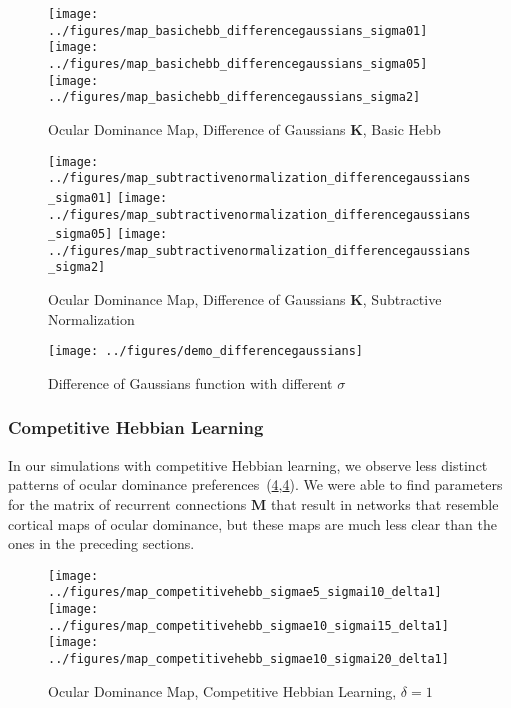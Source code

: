 \documentclass[pageno]{mat323paper}
\begin{document}
\begin{figure}[h]
\texttt{[image: ../figures/map\_basichebb\_differencegaussians\_sigma01]}
\texttt{[image: ../figures/map\_basichebb\_differencegaussians\_sigma05]}
\texttt{[image: ../figures/map\_basichebb\_differencegaussians\_sigma2]}
\caption{Ocular Dominance Map, Difference of Gaussians $\mathbf{K}$, Basic Hebb}
\label{fig:map_differencegaussians_hebb}
\end{figure}

\begin{figure}[h]
\texttt{[image: ../figures/map\_subtractivenormalization\_differencegaussians\_sigma01]}
\texttt{[image: ../figures/map\_subtractivenormalization\_differencegaussians\_sigma05]}
\texttt{[image: ../figures/map\_subtractivenormalization\_differencegaussians\_sigma2]}
\caption{Ocular Dominance Map, Difference of Gaussians $\mathbf{K}$, Subtractive Normalization}
\label{fig:map_differencegaussians_subtractivenormalization}
\end{figure}

\begin{figure}[h]
\centering
\texttt{[image: ../figures/demo\_differencegaussians]}
\caption{Difference of Gaussians function with different $\sigma$}
\label{fig:demo_differencegaussians}
\end{figure}

\subsubsection{Competitive Hebbian Learning}
In our simulations with competitive Hebbian learning, we observe less distinct patterns of ocular dominance preferences~(\ref{fig:map_competitivehebb},\ref{fig:map_competitivehebb}). We were able to find parameters for the matrix of recurrent connections $\mathbf{M}$ that result in networks that resemble cortical maps of ocular dominance, but these maps are much less clear than the ones in the preceding sections.

\begin{figure}[h]
\texttt{[image: ../figures/map\_competitivehebb\_sigmae5\_sigmai10\_delta1]}
\texttt{[image: ../figures/map\_competitivehebb\_sigmae10\_sigmai15\_delta1]}
\texttt{[image: ../figures/map\_competitivehebb\_sigmae10\_sigmai20\_delta1]}
\caption{Ocular Dominance Map, Competitive Hebbian Learning, $\delta=1$}
\label{fig:map_competitivehebb}
\end{figure}
\end{document}
